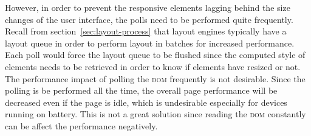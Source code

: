 \documentclass[a4paper,11pt]{kth-mag}
\begin{document}
          However, in order to prevent the responsive elements lagging behind the size changes of the user interface, the polls need to be performed quite frequently.
          Recall from section~\ref{sec:layout-process} that layout engines typically have a layout queue in order to perform layout in batches for increased performance.
          Each poll would force the layout queue to be flushed since the computed style of elements needs to be retrieved in order to know if elements have resized or not.
          The performance impact of polling the \textsc{dom} frequently is not desirable.
          Since the polling is be performed all the time, the overall page performance will be decreased even if the page is idle, which is undesirable especially for devices running on battery.
          This is not a great solution since reading the \textsc{dom} constantly can be affect the performance negatively. 
\end{document}
